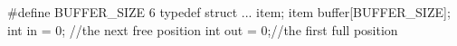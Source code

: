\documentclass[varwidth=19.2em,crop]{standalone}
\begin{document}
\begin{ccode}
#define BUFFER_SIZE 6
typedef struct {
  ...
} item;
item buffer[BUFFER_SIZE];
int in = 0; //the next free position
int out = 0;//the first full position  
\end{ccode}
\end{document}
